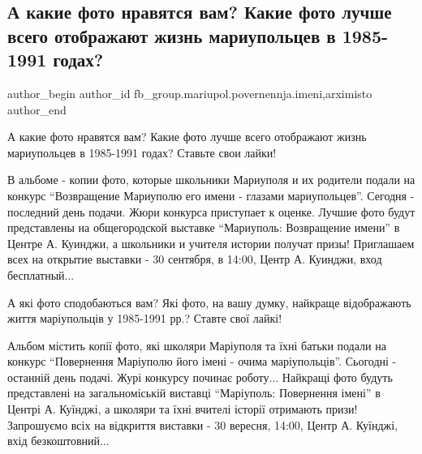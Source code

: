  
 
 
 
 
 
\subsection{А какие фото нравятся вам? Какие фото лучше всего отображают жизнь мариупольцев в 1985-1991 годах?}
\label{sec:27_11_2019.fb.fb_group.mariupol.povernennja.imeni.1.kakie_foto_nravjatsja_vam}
 
\ifcmt
 author_begin
   author_id fb_group.mariupol.povernennja.imeni,arximisto
 author_end
\fi

А какие фото нравятся вам? Какие фото лучше всего отображают жизнь мариупольцев
в 1985-1991 годах? Ставьте свои лайки! 🙂

В альбоме - копии фото, которые школьники Мариуполя и их родители подали на
конкурс \enquote{Возвращение Мариуполю его имени - глазами мариупольцев}. Сегодня -
последний день подачи. Жюри конкурса приступает к оценке. Лучшие фото будут
представлены на общегородской выставке \enquote{Мариуполь: Возвращение имени} в Центре
А. Куинджи, а школьники и учителя истории получат призы! Приглашаем всех на
открытие выставки - 30 сентября, в 14:00, Центр А. Куинджи, вход бесплатный...

А які фото сподобаються вам? Які фото, на вашу думку, найкраще відображають
життя маріупольців у 1985-1991 рр.? Ставте свої лайкі! 🙂 

Альбом містить копії фото, які школяри Маріуполя та їхні батьки подали на
конкурс \enquote{Повернення Маріуполю його імені - очима маріупольців}. Сьогодні -
останній день подачі. Журі конкурсу починає роботу... Найкращі фото будуть
представлені на загальноміській виставці \enquote{Маріуполь: Повернення імені} в Центрі
А. Куїнджі, а школяри та їхні вчителі історії отримають призи! Запрошуємо всіх
на відкриття виставки - 30 вересня, 14:00, Центр А. Куїнджі, вхід
безкоштовний...
